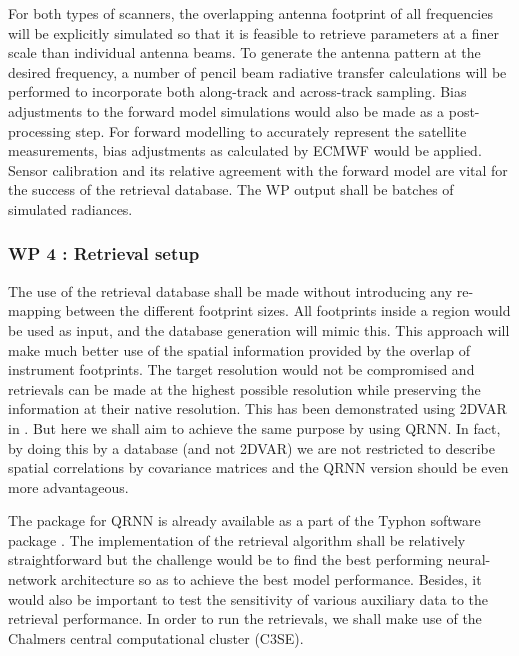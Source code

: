 \documentclass[12pt,oneside,a4paper]{article}
\begin{document}
For both types of scanners, the overlapping antenna footprint of all frequencies will be explicitly simulated so that it is feasible to retrieve parameters at a finer scale than individual antenna beams. To generate the antenna pattern at the desired frequency, a number of pencil beam radiative transfer calculations will be performed to incorporate both along-track and across-track sampling. Bias adjustments to the forward model simulations would also be made as a post-processing step. For forward modelling to accurately represent the satellite measurements, bias adjustments as calculated by ECMWF would be applied. Sensor calibration and its relative agreement with the forward model are vital for the success of the retrieval database. 
The WP output shall be batches of simulated radiances.

\subsubsection*{WP 4 : Retrieval setup}
%
\label{sec:setup}
The use of the retrieval database shall be made without introducing any re-mapping between the different footprint sizes. All footprints inside a region would be used as input, and the database generation will mimic this. This approach will make much better use of the spatial information provided by the overlap of instrument footprints. The target resolution would not be compromised and retrievals can be made at the highest possible resolution while preserving the information at their native resolution. This has been demonstrated using 2DVAR in \citet{duncan:onthe:19}. But here we shall aim to achieve the same purpose by using QRNN. In fact, by doing this by a database (and not 2DVAR) we are not restricted to describe spatial correlations by covariance matrices and the QRNN version should be even more advantageous.

The package for QRNN is already available as a part of the Typhon software package \citep{lemke:2020:typhon}. The implementation of the retrieval algorithm shall be relatively straightforward but the challenge would be to find the best performing neural-network architecture so as to achieve the best model performance. Besides, it would also be important to test the sensitivity of various auxiliary data to the retrieval performance. In order to run the retrievals, we shall make use of the Chalmers central computational cluster (C3SE).
\end{document}
